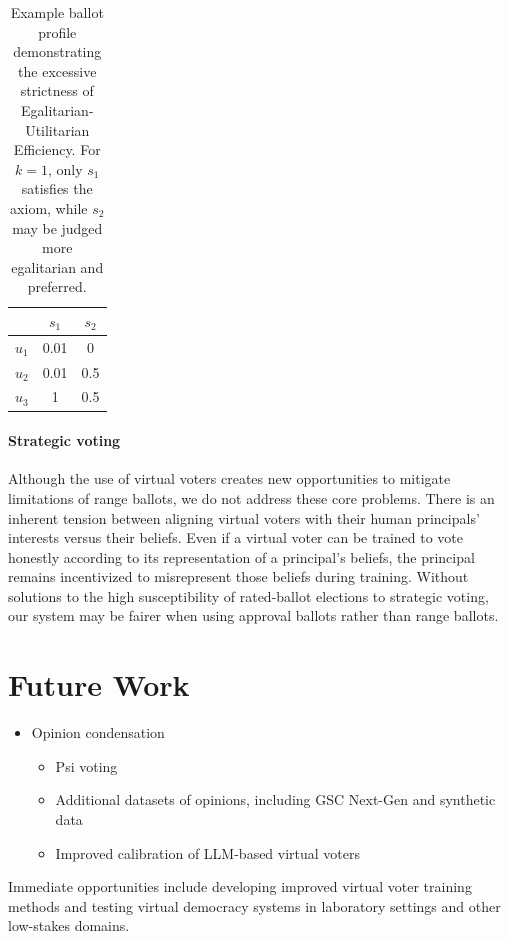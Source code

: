 \documentclass[11pt]{article}
\begin{document}
\begin{table}[t]
\centering
\begin{tabular}{lcc}
\hline
 & $s_1$ & $s_2$ \\
\hline
$u_1$ & 0.01 & 0 \\
$u_2$ & 0.01 & 0.5 \\
$u_3$ & 1 & 0.5 \\
\hline
\end{tabular}
\caption{Example ballot profile demonstrating the excessive strictness of Egalitarian-Utilitarian Efficiency. For $k=1$, only $s_1$ satisfies the axiom, while $s_2$ may be judged more egalitarian and preferred.}
\label{tab:egal-util-strict}
\end{table}

\paragraph{Strategic voting}
Although the use of virtual voters creates new opportunities to mitigate limitations of range ballots, we do not address these core problems. There is an inherent tension between aligning virtual voters with their human principals’ interests versus their beliefs. Even if a virtual voter can be trained to vote honestly according to its representation of a principal’s beliefs, the principal remains incentivized to misrepresent those beliefs during training. Without solutions to the high susceptibility of rated-ballot elections to strategic voting, our system may be fairer when using approval ballots rather than range ballots.

\section{Future Work}

\begin{itemize}
    \item Opinion condensation
    \begin{itemize}
        \item Psi voting
        \item Additional datasets of opinions, including GSC Next-Gen and synthetic data
        \item Improved calibration of LLM-based virtual voters
    \end{itemize}
\end{itemize}


Immediate opportunities include developing improved virtual voter training methods and testing virtual democracy systems in laboratory settings and other low-stakes domains.
\end{document}
